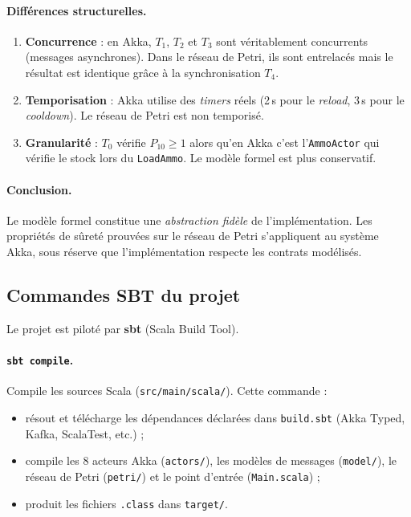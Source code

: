 \documentclass[11pt,a4paper]{article}
\newcommand{\code}[1]{\texttt{#1}}
\begin{document}
\paragraph{Différences structurelles.}
\begin{enumerate}[leftmargin=1.2cm,itemsep=2pt]
  \item \textbf{Concurrence} : en Akka, $T_1$, $T_2$ et $T_3$ sont
        véritablement concurrents (messages asynchrones). Dans le réseau
        de Petri, ils sont entrelacés mais le résultat est identique grâce
        à la synchronisation $T_4$.
  \item \textbf{Temporisation} : Akka utilise des \emph{timers} réels
        (2\,s pour le \emph{reload}, 3\,s pour le \emph{cooldown}). Le
        réseau de Petri est non temporisé.
  \item \textbf{Granularité} : $T_0$ vérifie $P_{10} \geq 1$ alors qu'en
        Akka c'est l'\code{AmmoActor} qui vérifie le stock lors du
        \code{LoadAmmo}. Le modèle formel est plus conservatif.
\end{enumerate}

\paragraph{Conclusion.}
Le modèle formel constitue une \emph{abstraction fidèle} de l'implémentation.
Les propriétés de sûreté prouvées sur le réseau de Petri s'appliquent au
système Akka, sous réserve que l'implémentation respecte les contrats
modélisés.

\subsection{Commandes SBT du projet}

Le projet est piloté par \textbf{sbt} (Scala Build Tool).

\paragraph{\code{sbt compile}.}
Compile les sources Scala (\code{src/main/scala/}). Cette commande :
\begin{itemize}[leftmargin=1.2cm,itemsep=1pt]
  \item résout et télécharge les dépendances déclarées dans \code{build.sbt}
        (Akka Typed, Kafka, ScalaTest, etc.) ;
  \item compile les 8 acteurs Akka (\code{actors/}), les modèles de
        messages (\code{model/}), le réseau de Petri (\code{petri/}) et le
        point d'entrée (\code{Main.scala}) ;
  \item produit les fichiers \code{.class} dans \code{target/}.
\end{itemize}
\end{document}
